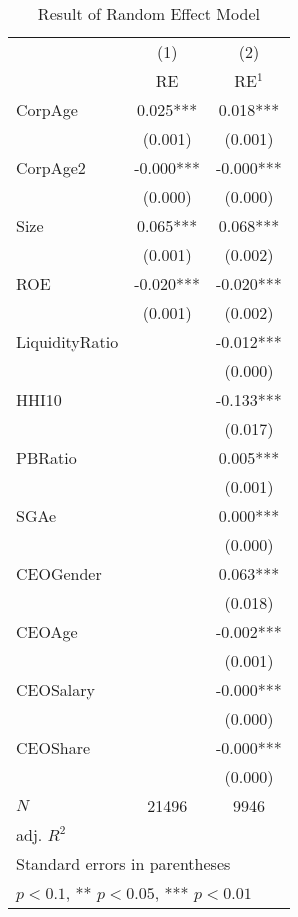 \begin{table}[htbp]\centering
\def\sym#1{\ifmmode^{#1}\else\(^{#1}\)\fi}
\caption{Result of Random Effect Model \label{tab:regressionRE}}
\begin{tabular}{l*{2}{c}}
\hline\hline
            &\multicolumn{1}{c}{(1)}&\multicolumn{1}{c}{(2)}\\
            &\multicolumn{1}{c}{RE}&\multicolumn{1}{c}{RE$^{1}$}\\
\hline
CorpAge     &       0.025***&       0.018***\\
            &     (0.001)   &     (0.001)   \\
[1em]
CorpAge2    &      -0.000***&      -0.000***\\
            &     (0.000)   &     (0.000)   \\
[1em]
Size        &       0.065***&       0.068***\\
            &     (0.001)   &     (0.002)   \\
[1em]
ROE         &      -0.020***&      -0.020***\\
            &     (0.001)   &     (0.002)   \\
[1em]
LiquidityRatio&               &      -0.012***\\
            &               &     (0.000)   \\
[1em]
HHI10       &               &      -0.133***\\
            &               &     (0.017)   \\
[1em]
PBRatio     &               &       0.005***\\
            &               &     (0.001)   \\
[1em]
SGAe        &               &       0.000***\\
            &               &     (0.000)   \\
[1em]
CEOGender   &               &       0.063***\\
            &               &     (0.018)   \\
[1em]
CEOAge      &               &      -0.002***\\
            &               &     (0.001)   \\
[1em]
CEOSalary   &               &      -0.000***\\
            &               &     (0.000)   \\
[1em]
CEOShare    &               &      -0.000***\\
            &               &     (0.000)   \\
\hline
\(N\)       &       21496   &        9946   \\
adj. \(R^{2}\)&               &               \\
\hline\hline
\multicolumn{3}{l}{\footnotesize Standard errors in parentheses}\\
\multicolumn{3}{l}{\footnotesize * \(p<0.1\), ** \(p<0.05\), *** \(p<0.01\)}\\
\end{tabular}
\end{table}

